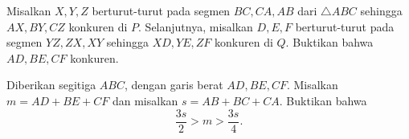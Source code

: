 \documentclass[12pt]{scrartcl}
\begin{document}
	\begin{soalbaru}
		Misalkan $X,Y,Z$ berturut-turut pada segmen $BC,CA,AB$ dari $\triangle ABC$ sehingga $AX, BY, CZ$ konkuren di $P$. Selanjutnya, misalkan $D,E,F$ berturut-turut pada segmen $YZ,ZX,XY$ sehingga $XD,YE,ZF$ konkuren di $Q$. Buktikan bahwa $AD,BE,CF$ konkuren.
	\end{soalbaru}
	
	\begin{soalbaru}
		Diberikan segitiga $ABC$, dengan garis berat $AD, BE, CF$. Misalkan $m=AD+BE+CF$ dan misalkan $s=AB+BC+CA$. Buktikan bahwa $$\dfrac{3s}{2} > m > \dfrac{3s}{4}.$$
	\end{soalbaru}
	
\end{document}
